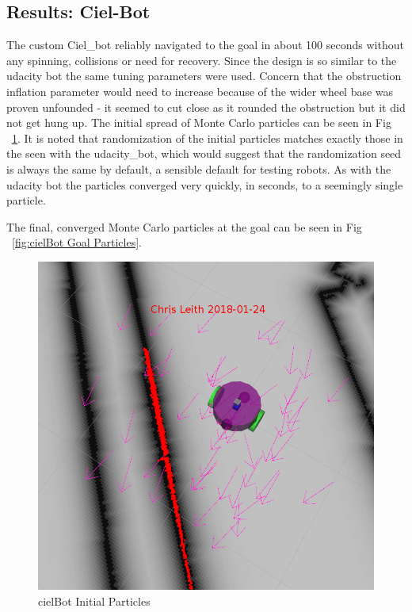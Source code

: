 \documentclass[10pt,journal,compsoc]{IEEEtran}
\begin{document}
\subsection{Results: Ciel-Bot}
The custom Ciel\_bot reliably navigated to the goal in about 100 seconds without any spinning, collisions or need for recovery. Since the design is so similar to the udacity bot the same tuning parameters were used. Concern that the obstruction inflation parameter would need to increase because of the wider wheel base was proven unfounded - it seemed to cut close as it rounded the obstruction but it did not get hung up.
The initial spread of Monte Carlo particles can be seen in Fig ~\ref{fig:cielBot Initial Particles}. 
It is noted that randomization of the initial particles matches exactly those in the seen with the udacity\_bot, which would suggest that the randomization seed is always the same by default, a sensible default for testing robots. As with the udacity bot the particles converged very quickly, in seconds, to a seemingly single particle.

The final, converged Monte Carlo particles at the goal can be seen in Fig ~\ref{fig:cielBot Goal Particles}.

\begin{figure}[h]
      \centering
      \includegraphics[width=\linewidth]{../Assets/writeupImages/cielBot_rvizInit.png}
      \caption{cielBot Initial Particles }
      \label{fig:cielBot Initial Particles}
\end{figure}
\end{document}
